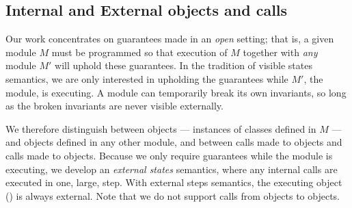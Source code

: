 


\subsection{Internal and External objects and calls}
\label{s:concepts}

Our work concentrates on guarantees made in an \emph{open} setting; that is, a given module
$M$ must be programmed so that %
execution of $M$ together with \emph{any} \externalM 
module $M'$ will uphold these guarantees. In the tradition of
visible states semantics, we are  only interested in upholding the guarantees while 
$M'$, the  \emph{\externalM} module, is executing. A module can
temporarily break its own invariants,
so long as the broken invariants are never visible externally.
   
We therefore distinguish between \emph{\internalO}
objects --- instances of classes defined in $M$ ---
and \emph{\externalO} objects defined in any other module, and
between \emph{\internalC} calls    made %
 to \internalO objects and \emph{\externalC} calls made %
 to \externalC objects. %
%
%
Because we only require guarantees while 
the  \externalM module  is executing,
we develop an \emph{external states} semantics, where
 any internal calls are executed in one, large, step.
With external steps semantics,  the executing object () is always   external. 
Note that we do not support calls from
\internalO objects to \externalO objects.
 

\newcommand{\vertsp} {\vspace{.02in}} 
 
